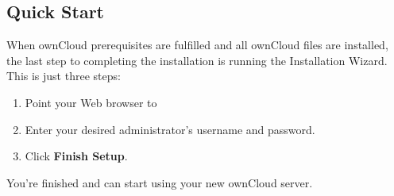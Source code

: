 \documentclass[letterpaper,10pt,english]{sphinxmanual}
\begin{document}
\subsection{Quick Start}
\label{installation/installation_wizard:quick-start}
When ownCloud prerequisites are fulfilled and all ownCloud files are installed,
the last step to completing the installation is running the Installation
Wizard.
This is just three steps:
\begin{enumerate}
\item {} 
Point your Web browser to 

\item {} 
Enter your desired administrator's username and password.

\item {} 
Click \textbf{Finish Setup}.

\end{enumerate}
\begin{figure}[htbp]
\centering

\end{figure}

You're finished and can start using your new ownCloud server.
\end{document}

